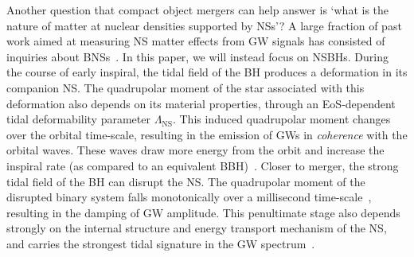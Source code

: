\documentclass[aps,prd,amsmath,floats,floatfix, twocolumn,
superscriptaddress,nofootinbib,showpacs]{revtex4-1}
\newcommand{\lambdans}{\Lambda_\mathrm{NS}}
\begin{document}
Another question that compact object mergers can help answer is `what is the 
nature of matter at nuclear densities supported by NSs'?
A large fraction of past work aimed at measuring NS matter effects from GW
signals has consisted of inquiries about BNSs~\cite{Lee1999a,Lee1999b,Lee2000,
oechslin:07,Read:2008iy,Markakis:2010mp,Markakis:2011vd,stergioulas:11,
East:2011xa,Lackey2014,Wade:2014vqa,Bauswein:2014qla}. In this paper, we will
instead focus on NSBHs.
% 
During the course of early inspiral, the tidal field of the BH produces a
deformation in its companion NS. The quadrupolar moment of the star associated
with this deformation also depends on its material properties, through an EoS-dependent
tidal deformability parameter $\lambdans$. This induced quadrupolar moment
changes over the orbital time-scale, resulting in the emission of GWs in {\it
coherence} with the orbital waves.
These waves draw more energy from the orbit and increase the inspiral rate (as
compared to an equivalent BBH)~\cite{Flanagan2008}.
% 
% 
Closer to merger, the strong tidal field of the BH can disrupt the NS. The
quadrupolar moment of the disrupted binary system falls monotonically over a
millisecond time-scale~\cite{Kyutoku:2010zd,Lackey:2013axa,Lovelace:2013vma,
Foucart:2015a,Pannarale:2015jia}, resulting in the damping of GW amplitude.
% 
This penultimate stage also depends strongly on the internal structure and energy
transport mechanism of the NS, and carries the strongest tidal signature in the
GW spectrum~\cite{Foucart:2014nda,Deaton2013}.

\end{document}
